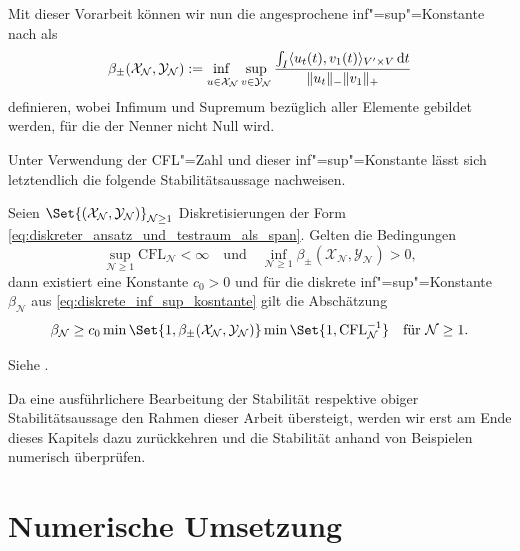 \documentclass[../main.tex]{subfiles}
\begin{document}
Mit dieser Vorarbeit können wir nun die angesprochene inf"=sup"=Konstante nach \cite[57]{Andreev:2012ep} als
\begin{equation}
    \beta_{\pm}(\mathcal X_{\mathcal N}, \mathcal Y_{\mathcal N}) := \infsup{u \in \mathcal X_{\mathcal N}}{v \in \mathcal Y_{\mathcal N}} \frac{\int_{I} \skp{u_t(t)}{v_{1}(t)}{V' \times V} \diff t}{\norm{u_t}_{-} \norm{v_{1}}_{+}}
\end{equation}
definieren, wobei Infimum und Supremum bezüglich aller Elemente gebildet werden, für die der Nenner nicht Null wird.

Unter Verwendung der CFL"=Zahl und dieser inf"=sup"=Konstante lässt sich letztendlich die folgende Stabilitätsaussage nachweisen.

\begin{Satz}\label{satz:untere_schranke_fuer_infsup_nach_andreev}
    Seien $\Set{(\mathcal X_{\mathcal N}, \mathcal Y_{\mathcal N})}_{\mathcal N \geq 1}$ Diskretisierungen der Form \cref{eq:diskreter_ansatz_und_testraum_als_span}.
    Gelten die Bedingungen
    \begin{equation}
        \sup_{\mathcal N \geq 1} \mathrm{CFL}_{\mathcal N} < \infty
        \quad \text{und} \quad
        \inf_{\mathcal N \geq 1} \beta_{\pm}(\mathcal X_{\mathcal N}, \mathcal Y_{\mathcal N}) > 0,
    \end{equation}
    dann existiert eine Konstante $c_{0} > 0$ und für die diskrete inf"=sup"=Konstante $\beta_{\mathcal N}$ aus \cref{eq:diskrete_inf_sup_kosntante} gilt die Abschätzung
    \begin{equation}
        \beta_{\mathcal N} \geq c_{0} \min\Set{1, \beta_{\pm}(\mathcal X_{\mathcal N}, \mathcal Y_{\mathcal N})} \min\Set{1, \mathrm{CFL}_{\mathcal N}^{-1}} \quad \text{für } \mathcal N \geq 1.
    \end{equation}

    \begin{Beweis}
        Siehe \cite[Subsection 5.2.2]{Andreev:2012ep}.
    \end{Beweis}
\end{Satz}

Da eine ausführlichere Bearbeitung der Stabilität respektive obiger Stabilitätsaussage den Rahmen dieser Arbeit übersteigt, werden wir erst am Ende dieses Kapitels dazu zurückkehren und die Stabilität anhand von Beispielen numerisch überprüfen.


\section{Numerische Umsetzung} %
\label{section:galerkin_numerische_umsetzung}
\end{document}

